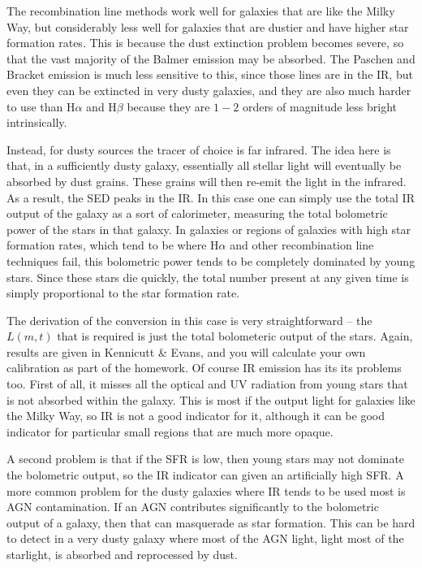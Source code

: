 The recombination line methods work well for galaxies that are like the Milky Way, but considerably less well for galaxies that are dustier and have higher star formation rates. This is because the dust extinction problem becomes severe, so that the vast majority of the Balmer emission may be absorbed. The Paschen and Bracket emission is much less sensitive to this, since those lines are in the IR, but even they can be extincted in very dusty galaxies, and they are also much harder to use than H$\alpha$ and H$\beta$ because they are $1-2$ orders of magnitude less bright intrinsically.

Instead, for dusty sources the tracer of choice is far infrared. The idea here is that, in a sufficiently dusty galaxy, essentially all stellar light will eventually be absorbed by dust grains. These grains will then re-emit the light in the infrared. As a result, the SED peaks in the IR. In this case one can simply use the total IR output of the galaxy as a sort of calorimeter, measuring the total bolometric power of the stars in that galaxy. In galaxies or regions of galaxies with high star formation rates, which tend to be where H$\alpha$ and other recombination line techniques fail, this bolometric power tends to be completely dominated by young stars. Since these stars die quickly, the total number present at any given time is simply proportional to the star formation rate.

The derivation of the conversion in this case is very straightforward -- the $L(m,t)$ that is required is just the total bolometeric output of the stars. Again, results are given in Kennicutt \& Evans, and you will calculate your own calibration as part of the homework. Of course IR emission has its its problems too. First of all, it misses all the optical and UV radiation from young stars that is not absorbed within the galaxy. This is most if the output light for galaxies like the Milky Way, so IR is not a good indicator for it, although it can be good indicator for particular small regions that are much more opaque.

A second problem is that if the SFR is low, then young stars may not dominate the bolometric output, so the IR indicator can given an artificially high SFR. A more common problem for the dusty galaxies where IR tends to be used most is AGN contamination. If an AGN contributes significantly to the bolometric output of a galaxy, then that can masquerade as star formation. This can be hard to detect in a very dusty galaxy where most of the AGN light, light most of the starlight, is absorbed and reprocessed by dust.

